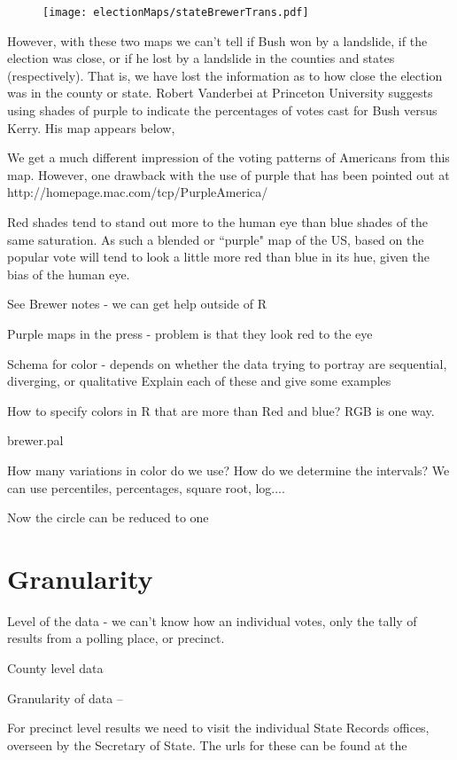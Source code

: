 \begin{figure}
\texttt{[image: electionMaps/stateBrewerTrans.pdf]}
\caption{}
\label{fig:stateBrewerTrans}
\end{figure}


However, with these two maps we can't tell if Bush won by a landslide, if the election was close, or if he lost by a landslide in the counties and states (respectively). That is, we have lost the information as to how close the election was in the county or state. Robert Vanderbei at Princeton University suggests using shades of purple to indicate the percentages of votes cast for Bush versus Kerry. His map appears below,

We get a much different impression of the voting patterns of Americans from this map. However, one drawback with the use of purple that has been pointed out at  http://homepage.mac.com/tcp/PurpleAmerica/

    Red shades tend to stand out more to the human eye than blue shades of the same saturation. As such a blended or ``purple" map of the US, based on the popular vote will tend to look a little more red than blue in its hue, given the bias of the human eye. 

See Brewer notes - we can get help outside of R

Purple maps in the press - problem is that they look red to the eye

Schema for color - depends on whether the data trying
to portray are sequential, diverging, or qualitative
Explain each of these and give some examples

How to specify colors in R that are more than Red and blue?
RGB is one way.

brewer.pal

How many variations in color do we use?
How do we determine the intervals? We can use percentiles,
percentages, square root, log....

Now the circle can be reduced to one 


\section{Granularity}
Level of the data - we can't know how an individual
votes, only the tally of results from a polling place,
or precinct.

County level data

Granularity of data --

For precinct level results we  
need to visit the individual State Records offices,
overseen by the Secretary of State.
The urls for these can be found at the 


